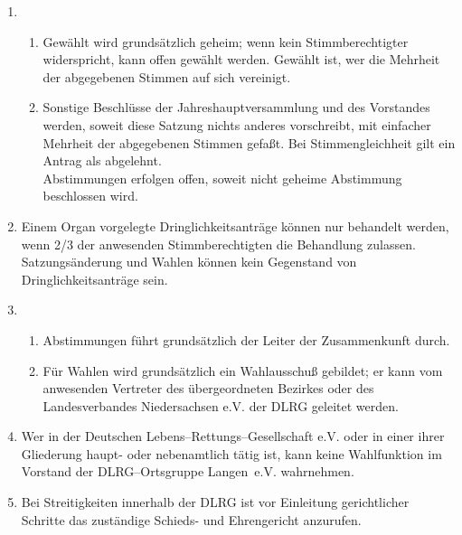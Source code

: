 \documentclass[%
12pt, %
a4paper, %
headsepline, %
footsepline, %
parskip, %
headings=normal, %
]{scrartcl}
\begin{document}
\begin{enumerate}
\begin{enumerate}[noitemsep]
      \end{enumerate}
    \item \begin{enumerate}[noitemsep]
        \item Gewählt wird grundsätzlich geheim; wenn kein Stimmberechtigter widerspricht, kann offen gewählt werden. Gewählt ist, wer die Mehrheit der abgegebenen Stimmen auf sich vereinigt.
        \item Sonstige Beschlüsse der Jahreshauptversammlung und des Vorstandes werden, soweit diese Satzung nichts anderes vorschreibt, mit einfacher Mehrheit der abgegebenen Stimmen gefaßt. Bei Stimmengleichheit gilt ein Antrag als abgelehnt.\\
          Abstimmungen erfolgen offen, soweit nicht geheime Abstimmung beschlossen wird.
      \end{enumerate}
    \item Einem Organ vorgelegte Dringlichkeitsanträge können nur behandelt werden, wenn \num{2/3} der anwesenden Stimmberechtigten die Behandlung zulassen. Satzungsänderung und Wahlen können kein Gegenstand von Dringlichkeitsanträge sein.
    \item \begin{enumerate}[noitemsep]
        \item Abstimmungen führt grundsätzlich der Leiter der Zusammenkunft durch.
        \item Für Wahlen wird grundsätzlich ein Wahlausschuß gebildet; er kann vom anwesenden Vertreter des übergeordneten Bezirkes oder des Landesverbandes Niedersachsen e.V. der DLRG geleitet werden.
      \end{enumerate}
    \item Wer in der Deutschen Lebens--Rettungs--Gesellschaft e.V. oder in einer ihrer Gliederung haupt- oder nebenamtlich tätig ist, kann keine Wahlfunktion im Vorstand der DLRG--Ortsgruppe Langen~e.V. wahrnehmen.
    \item Bei Streitigkeiten innerhalb der DLRG ist vor Einleitung gerichtlicher Schritte das zuständige Schieds- und Ehrengericht anzurufen.
\end{enumerate}
\end{document}
